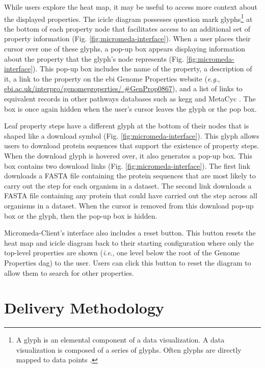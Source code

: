 While users explore the heat map, it may be useful to access more context about 
the displayed properties. The icicle diagram possesses question mark 
glyphs\footnote{A glyph is an elemental component of a data visualization. A 
data visualization is composed of a series of glyphs. Often glyphs are directly 
mapped to data points \cite{chen}.} at the bottom of each property node that 
facilitates access to an additional set of property information (Fig. 
\ref{fig:micromeda-interface}). When a user places their cursor over one of 
these glyphs, a pop-up box appears displaying information about the property 
that the glyph's node represents (Fig. \ref{fig:micromeda-interface}). This 
pop-up box includes the name of the property, a description of it, a link to the 
property on the \gls{ebi}  Genome Properties website (\textit{e}.\textit{g}., 
\href{https://www.ebi.ac.uk/interpro/genomeproperties/#GenProp0867}{ebi.ac.uk/interpro/genomeproperties/ 
\#GenProp0867}), and a list of links to equivalent records in other pathways 
databases such as \gls{kegg} \cite{kanehisa2000kegg} and MetaCyc 
\cite{karp2002metacyc}. The box is once again hidden when the user's cursor 
leaves the glyph or the pop box.

Leaf property steps have a different glyph at the bottom of their nodes that is 
shaped like a download symbol (Fig. \ref{fig:micromeda-interface}). This glyph 
allows users to download protein sequences that support the existence of 
property steps. When the download glyph is hovered over, it also generates a 
pop-up box. This box contains two download links (Fig. 
\ref{fig:micromeda-interface}). The first link downloads a FASTA file containing 
the protein sequences that are most likely to carry out the step for each 
organism in a dataset. The second link downloads a FASTA file containing any 
protein that could have carried out the step across all organisms in a dataset. 
When the cursor is removed from this download pop-up box or the glyph, then the 
pop-up box is hidden.

Micromeda-Client's interface also includes a reset button. This button resets 
the heat map and icicle diagram back to their starting configuration where only 
the top-level properties are shown (\textit{i}.\textit{e}., one level below the root of the Genome 
Properties \gls{dag}) to the user. Users can click this button to reset the 
diagram to allow them to search for other properties.

\section{Delivery Methodology} \label{client-delivery-method}

